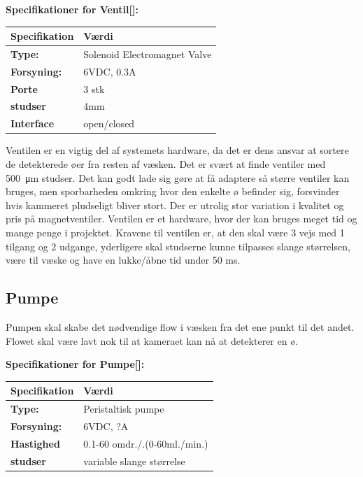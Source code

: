 \textbf{Specifikationer for Ventil[\citet{DH5}]:} 
\begin{center}
		\begin{longtable}{ | m{6.5cm} | m{6.5cm}| } 
			\hline
			\textbf{Specifikation} &\textbf{Værdi} \\ 
			\hline
			\textbf{Type:} & Solenoid Electromagnet Valve \\ 
			\hline
			\textbf{Forsyning:} & 6VDC, 0.3A  \\ 
			\hline
			\textbf{Porte} & 3 stk \\ 
			\hline		
			\textbf{studser} & 4mm  \\ 
			\hline	
			\textbf{Interface} & open/closed  \\ 
			\hline	
		\end{longtable}
\end{center}
Ventilen er en vigtig del af systemets hardware, da det er dens ansvar at sortere de detekterede øer fra resten af væsken. Det er svært at finde ventiler med \SI{500}{\micro\metre} studser. Det kan godt lade sig gøre at få adaptere så større ventiler kan bruges, men sporbarheden omkring hvor den enkelte ø befinder sig, forsvinder hvis kammeret pludseligt bliver stort. Der er utrolig stor variation i kvalitet og pris på magnetventiler. Ventilen er et hardware, hvor der kan bruges meget tid og mange penge i projektet.
Kravene til ventilen er, at den skal være 3 vejs med 1 tilgang og 2 udgange, yderligere skal studserne kunne tilpasses slange størrelsen, være til væske og have en lukke/åbne tid under 50 ms.

\newpage
\subsection{Pumpe}
Pumpen skal skabe det nødvendige flow i væsken fra det ene punkt til det andet. Flowet skal være lavt nok til at kameraet kan nå at detekterer en ø.

\textbf{Specifikationer for Pumpe[\citet{DH8}]:} 
\begin{center}
		\begin{longtable}{ | m{6.5cm} | m{6.5cm}| } 
			\hline
			\textbf{Specifikation} &\textbf{Værdi} \\ 
			\hline
			\textbf{Type:} & Peristaltisk pumpe \\ 
			\hline
			\textbf{Forsyning:} & 6VDC, ?A  \\ 
			\hline
			\textbf{Hastighed} & 0.1-60 omdr./.(0-60ml./min.) \\ 
			\hline		
			\textbf{studser} & variable slange størrelse  \\ 
			\hline	
		\end{longtable}
\end{center}

